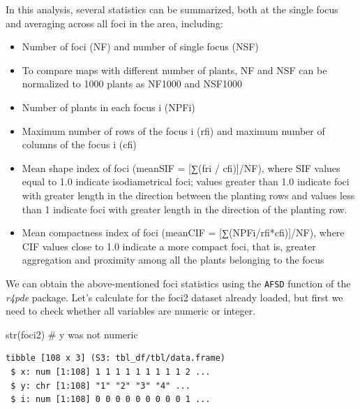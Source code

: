 \documentclass[
  letterpaper,
]{book}
\newenvironment{Shaded}{\begin{snugshade}}{\end{snugshade}}
\newcommand{\CommentTok}[1]{\textcolor[rgb]{0.37,0.37,0.37}{#1}}
\newcommand{\FunctionTok}[1]{\textcolor[rgb]{0.28,0.35,0.67}{#1}}
\newcommand{\NormalTok}[1]{\textcolor[rgb]{0.00,0.23,0.31}{#1}}
\newcommand{\OtherTok}[1]{\textcolor[rgb]{0.00,0.23,0.31}{#1}}
\newcommand{\SpecialCharTok}[1]{\textcolor[rgb]{0.37,0.37,0.37}{#1}}
\begin{document}
In this analysis, several statistics can be summarized, both at the
single focus and averaging across all foci in the area, including:

\begin{itemize}
\item
  Number of foci (NF) and number of single focus (NSF)
\item
  To compare maps with different number of plants, NF and NSF can be
  normalized to 1000 plants as NF1000 and NSF1000
\item
  Number of plants in each focus i (NPFi)
\item
  Maximum number of rows of the focus i (rfi) and maximum number of
  columns of the focus i (cfi)
\item
  Mean shape index of foci (meanSIF = {[}∑(fri / cfi){]}/NF), where SIF
  values equal to 1.0 indicate isodiametrical foci; values greater than
  1.0 indicate foci with greater length in the direction between the
  planting rows and values less than 1 indicate foci with greater length
  in the direction of the planting row.
\item
  Mean compactness index of foci (meanCIF = {[}∑(NPFi/rfi*cfi){]}/NF),
  where CIF values close to 1.0 indicate a more compact foci, that is,
  greater aggregation and proximity among all the plants belonging to
  the focus
\end{itemize}

We can obtain the above-mentioned foci statistics using the
\texttt{AFSD} function of the \emph{r4pde} package. Let's calculate for
the foci2 dataset already loaded, but first we need to check whether all
variables are numeric or integer.

\begin{Shaded}
\begin{Highlighting}[]
\FunctionTok{str}\NormalTok{(foci2) }\CommentTok{\# y was not numeric}
\end{Highlighting}
\end{Shaded}

\begin{verbatim}
tibble [108 x 3] (S3: tbl_df/tbl/data.frame)
 $ x: num [1:108] 1 1 1 1 1 1 1 1 1 2 ...
 $ y: chr [1:108] "1" "2" "3" "4" ...
 $ i: num [1:108] 0 0 0 0 0 0 0 0 0 1 ...
\end{verbatim}

\begin{Shaded}
\end{Shaded}
\end{document}
